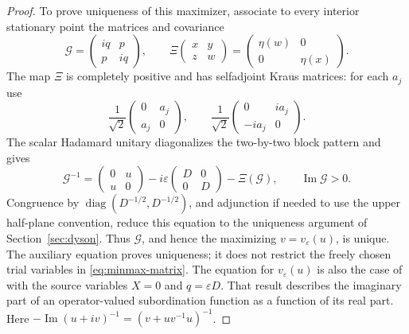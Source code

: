 \begin{proof}
To prove uniqueness of this maximizer, associate to every interior stationary point the matrices and covariance
\[
 \mathcal G=\begin{pmatrix}iq&p\\p&iq\end{pmatrix},
 \qquad
 \Xi\begin{pmatrix}x&y\\z&w\end{pmatrix}
       =\begin{pmatrix}\eta(w)&0\\0&\eta(x)\end{pmatrix}.
\]
The map $\Xi$ is completely positive and has selfadjoint Kraus matrices: for each $a_j$ use
\[
 \frac1{\sqrt2}\begin{pmatrix}0&a_j\\a_j&0\end{pmatrix},
 \qquad
 \frac1{\sqrt2}\begin{pmatrix}0&ia_j\\-ia_j&0\end{pmatrix}.
\]
The scalar Hadamard unitary diagonalizes the two-by-two block pattern and gives
\begin{equation}\label{eq:minmax-auxiliary-dyson}
 \mathcal G^{-1}
 =\begin{pmatrix}0&u\\u&0\end{pmatrix}
  -i\varepsilon\begin{pmatrix}D&0\\0&D\end{pmatrix}
  -\Xi(\mathcal G),\qquad \operatorname{Im}\mathcal G>0.
\end{equation}
Congruence by $\operatorname{diag}(D^{-1/2},D^{-1/2})$, and adjunction if needed to use the upper half-plane convention, reduce this equation to the uniqueness argument of Section~\ref{sec:dyson}.
Thus $\mathcal G$, and hence the maximizing $v=v_\varepsilon(u)$, is unique.
The auxiliary equation proves uniqueness; it does not restrict the freely chosen trial variables in \eqref{eq:minmax-matrix}.
The equation for $v_\varepsilon(u)$ is also the case of \cite[Proposition 3.1 and Remark 3.2]{Bel15} with the source variables $X=0$ and $q=\varepsilon D$.
That result describes the imaginary part of an operator-valued subordination function as a function of its real part.
Here $-\operatorname{Im}(u+iv)^{-1}=(v+uv^{-1}u)^{-1}$.


\end{proof}
